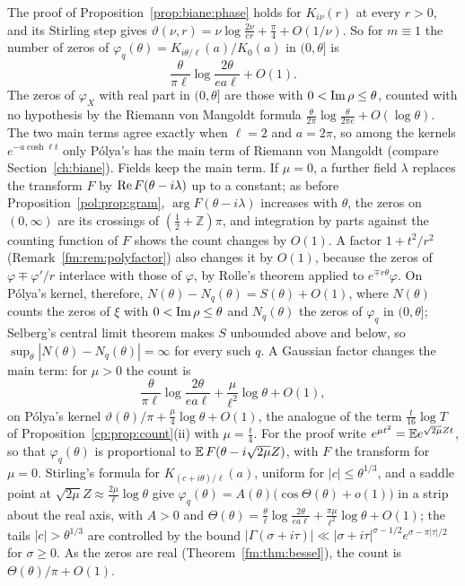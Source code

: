 \begin{remark}\label{fm:rem:besselcount}
The proof of Proposition~\ref{prop:biane:phase} holds for $K_{i\nu}(r)$ at every $r>0$, and its Stirling step gives $\vartheta(\nu,r)=\nu\log\frac{2\nu}{er}+\frac\pi4+O(1/\nu)$. So for $m\equiv1$ the number of zeros of $\varphi_q(\theta)=K_{i\theta/\ell}(a)/K_0(a)$ in $(0,\theta]$ is
\[
\frac\theta{\pi\ell}\log\frac{2\theta}{ea\ell}+O(1).
\]
The zeros of $\varphi_X$ with real part in $(0,\theta]$ are those with $0<\operatorname{Im}\rho\le\theta$, counted with no hypothesis by the Riemann von Mangoldt formula $\frac\theta{2\pi}\log\frac\theta{2\pi e}+O(\log\theta)$. The two main terms agree exactly when $\ell=2$ and $a=2\pi$, so among the kernels $e^{-a\cosh\ell t}$ only P\'olya's has the main term of Riemann von Mangoldt (compare Section~\ref{ch:biane}). Fields keep the main term. If $\mu=0$, a further field $\lambda$ replaces the transform $F$ by $\operatorname{Re} F(\theta-i\lambda)$ up to a constant; as before Proposition~\ref{pol:prop:gram}, $\arg F(\theta-i\lambda)$ increases with $\theta$, the zeros on $(0,\infty)$ are its crossings of $(\frac12+\mathbb Z)\pi$, and integration by parts against the counting function of $F$ shows the count changes by $O(1)$. A factor $1+t^2/r^2$ (Remark~\ref{fm:rem:polyfactor}) also changes it by $O(1)$, because the zeros of $\varphi\mp\varphi'/r$ interlace with those of $\varphi$, by Rolle's theorem applied to $e^{\mp r\theta}\varphi$. On P\'olya's kernel, therefore, $N(\theta)-N_q(\theta)=S(\theta)+O(1)$, where $N(\theta)$ counts the zeros of $\xi$ with $0<\operatorname{Im}\rho\le\theta$ and $N_q(\theta)$ the zeros of $\varphi_q$ in $(0,\theta]$; Selberg's central limit theorem \cite{Selberg46} makes $S$ unbounded above and below, so $\sup_\theta|N(\theta)-N_q(\theta)|=\infty$ for every such $q$. A Gaussian factor changes the main term: for $\mu>0$ the count is
\[
\frac\theta{\pi\ell}\log\frac{2\theta}{ea\ell}+\frac\mu{\ell^2}\log\theta+O(1),
\]
on P\'olya's kernel $\vartheta(\theta)/\pi+\frac\mu4\log\theta+O(1)$, the analogue of the term $\frac t{16}\log T$ of Proposition~\ref{cp:prop:count}(ii) with $\mu=\frac t4$. For the proof write $e^{\mu t^2}=\mathbb{E} e^{\sqrt{2\mu}Zt}$, so that $\varphi_q(\theta)$ is proportional to $\mathbb{E}\,F(\theta-i\sqrt{2\mu}Z)$, with $F$ the transform for $\mu=0$. Stirling's formula for $K_{(c+i\theta)/\ell}(a)$, uniform for $|c|\le\theta^{1/3}$, and a saddle point at $\sqrt{2\mu}Z\approx\frac{2\mu}\ell\log\theta$ give $\varphi_q(\theta)=A(\theta)\big(\cos\Theta(\theta)+o(1)\big)$ in a strip about the real axis, with $A>0$ and $\Theta(\theta)=\frac\theta\ell\log\frac{2\theta}{ea\ell}+\frac{\pi\mu}{\ell^2}\log\theta+O(1)$; the tails $|c|>\theta^{1/3}$ are controlled by the bound $|\Gamma(\sigma+i\tau)|\ll|\sigma+i\tau|^{\sigma-1/2}e^{\sigma-\pi|\tau|/2}$ for $\sigma\ge0$. As the zeros are real (Theorem~\ref{fm:thm:bessel}), the count is $\Theta(\theta)/\pi+O(1)$.
\end{remark}

